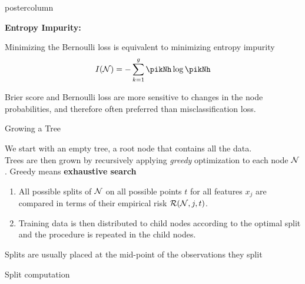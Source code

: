 \documentclass{beamer}
\begin{document}
\begin{frame}[fragile]{}
\begin{columns}
\begin{column}{.31\textwidth}
\begin{beamercolorbox}[center]{postercolumn}
\begin{minipage}{.98\textwidth}
{\begin{myblock}{ }
				\begin{codebox}
					\textbf{Entropy Impurity:}
				\end{codebox}
				Minimizing the Bernoulli loss is equivalent to minimizing entropy impurity $$I(\Np) = -\sum_{k=1}^g \pikNh \log \pikNh$$
				
				Brier score and Bernoulli loss are more sensitive to changes in the node probabilities, and therefore often preferred than misclassification loss.
					
				\end{myblock}
						\begin{myblock}{Growing a Tree}
			
			We start with an empty tree, a root node that contains all the data.\\Trees are then grown by recursively applying \emph{greedy} optimization to each node $\mathcal{N}$. Greedy means \textbf{exhaustive search}\\
						\begin{enumerate}
                        \item All possible splits of $\mathcal{N}$ on all possible points $t$ for all features $x_j$ are compared in terms of their empirical risk $\mathcal{R}(\mathcal{N}, j, t)$.
                        \item Training data is then distributed to child nodes according to the optimal split and the procedure is repeated in the child nodes.      \end{enumerate}
                        
            Splits are usually placed at the mid-point of the observations they split
					\end{myblock}
			
			\begin{myblock}{Split computation}
			

\end{myblock}}
\end{minipage}
\end{beamercolorbox}
\end{column}
\end{columns}
\end{frame}
\end{document}
